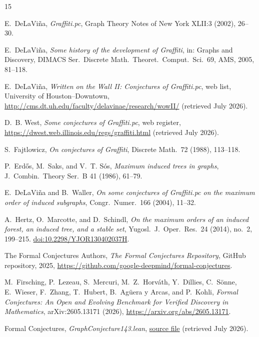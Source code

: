 \documentclass[11pt]{article}
\numberwithin{equation}{section}
\theoremstyle{remark}
\begin{document}
\begin{thebibliography}{15}

E.~DeLaVi\~na,
\emph{Graffiti.pc},
Graph Theory Notes of New York XLII:3 (2002), 26--30.

E.~DeLaVi\~na,
\emph{Some history of the development of Graffiti},
in: Graphs and Discovery, DIMACS Ser.\ Discrete Math.\ Theoret.\ Comput.\
Sci.\ 69, AMS, 2005, 81--118.

E.~DeLaVi\~na,
\emph{Written on the Wall II: Conjectures of Graffiti.pc},
web list, University of Houston--Downtown,
\url{http://cms.dt.uh.edu/faculty/delavinae/research/wowII/} (retrieved July
2026).

D.~B. West,
\emph{Some conjectures of Graffiti.pc},
web register,
\url{https://dwest.web.illinois.edu/regs/graffiti.html} (retrieved July
2026).

S.~Fajtlowicz,
\emph{On conjectures of Graffiti},
Discrete Math.\ 72 (1988), 113--118.

P.~Erd\H{o}s, M.~Saks, and V.~T. S\'os,
\emph{Maximum induced trees in graphs},
J.~Combin.\ Theory Ser.\ B 41 (1986), 61--79.

E.~DeLaVi\~na and B.~Waller,
\emph{On some conjectures of Graffiti.pc on the maximum order of induced
subgraphs},
Congr.\ Numer.\ 166 (2004), 11--32.

A.~Hertz, O.~Marcotte, and D.~Schindl,
\emph{On the maximum orders of an induced forest, an induced tree, and a
stable set},
Yugosl.\ J.\ Oper.\ Res.\ 24 (2014), no.~2, 199--215.
\href{https://doi.org/10.2298/YJOR130402037H}{doi:10.2298/YJOR130402037H}.

The Formal Conjectures Authors,
\emph{The Formal Conjectures Repository},
GitHub repository, 2025,
\url{https://github.com/google-deepmind/formal-conjectures}.

M.~Firsching, P.~Lezeau, S.~Mercuri, M.~Z.~Horv\'ath, Y.~Dillies,
C.~S\"onne, E.~Wieser, F.~Zhang, T.~Hubert, B.~Ag\"uera y Arcas,
and P.~Kohli,
\emph{Formal Conjectures: An Open and Evolving Benchmark for Verified
Discovery in Mathematics}, arXiv:2605.13171 (2026),
\url{https://arxiv.org/abs/2605.13171}.

Formal Conjectures,
\emph{GraphConjecture143.lean},
\href{https://github.com/google-deepmind/formal-conjectures/blob/main/FormalConjectures/WrittenOnTheWallII/GraphConjecture143.lean}{source file}
(retrieved July 2026).


\end{thebibliography}
\end{document}
